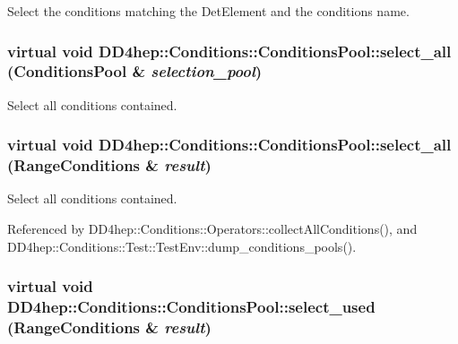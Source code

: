 Select the conditions matching the DetElement and the conditions name. \hypertarget{class_d_d4hep_1_1_conditions_1_1_conditions_pool_ac500caf2c66d0bad8523d83d569f969c}{
\subsubsection[{select\_\-all}]{\setlength{\rightskip}{0pt plus 5cm}virtual void DD4hep::Conditions::ConditionsPool::select\_\-all ({\bf ConditionsPool} \& {\em selection\_\-pool})}}
\label{class_d_d4hep_1_1_conditions_1_1_conditions_pool_ac500caf2c66d0bad8523d83d569f969c}


Select all conditions contained. \hypertarget{class_d_d4hep_1_1_conditions_1_1_conditions_pool_ab8a4f19ff244225b1d46f6574aa832cb}{
\subsubsection[{select\_\-all}]{\setlength{\rightskip}{0pt plus 5cm}virtual void DD4hep::Conditions::ConditionsPool::select\_\-all ({\bf RangeConditions} \& {\em result})}}
\label{class_d_d4hep_1_1_conditions_1_1_conditions_pool_ab8a4f19ff244225b1d46f6574aa832cb}


Select all conditions contained. 

Referenced by DD4hep::Conditions::Operators::collectAllConditions(), and DD4hep::Conditions::Test::TestEnv::dump\_\-conditions\_\-pools().\hypertarget{class_d_d4hep_1_1_conditions_1_1_conditions_pool_aab6927d2d318a4f16b8704423c6cdd7a}{
\subsubsection[{select\_\-used}]{\setlength{\rightskip}{0pt plus 5cm}virtual void DD4hep::Conditions::ConditionsPool::select\_\-used ({\bf RangeConditions} \& {\em result})}}
\label{class_d_d4hep_1_1_conditions_1_1_conditions_pool_aab6927d2d318a4f16b8704423c6cdd7a}


